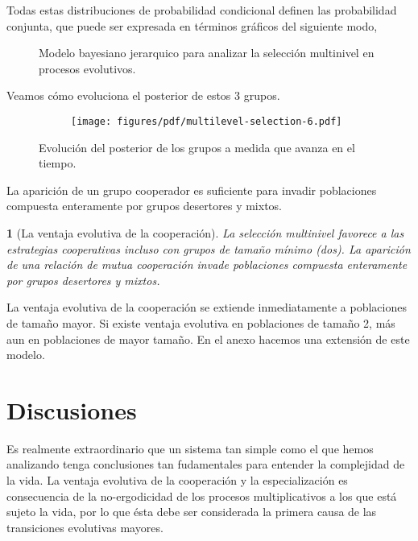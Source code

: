 \documentclass[a4paper,10pt]{article}
\newif\ifen
\newif\ifes
\newcommand{\en}[1]{\ifen#1\fi}
\newcommand{\es}[1]{\ifes#1\fi}
\newtheorem{conclution}{\en{Conclution}\es{Conclusión}}%
\begin{document}
Todas estas distribuciones de probabilidad condicional definen las probabilidad conjunta, que puede ser expresada en términos gráficos del siguiente modo,
%
\begin{figure}[H]
\centering
{}
\caption{
Modelo bayesiano jerarquico para analizar la selección multinivel en procesos evolutivos.
}
\label{fig:modelo_grafico}
\end{figure}
%
Veamos cómo evoluciona el posterior de estos 3 grupos.
%
\begin{figure}[H]
    \centering
    \begin{subfigure}[b]{0.66\textwidth}
    \texttt{[image: figures/pdf/multilevel-selection-6.pdf]}
    \end{subfigure}
    \caption{
    Evolución del posterior de los grupos a medida que avanza en el tiempo.
    }
    \label{fig:multilevel-selection-6}
\end{figure}
%
La aparición de un grupo cooperador es suficiente para invadir poblaciones compuesta enteramente por grupos desertores y mixtos.
%
\begin{conclution}[La ventaja evolutiva de la cooperación]
La selección multinivel favorece a las estrategias cooperativas incluso con grupos de tamaño mínimo (dos).
La aparición de una relación de mutua cooperación invade poblaciones compuesta enteramente por grupos desertores y mixtos.
\end{conclution}
%
La ventaja evolutiva de la cooperación se extiende inmediatamente a poblaciones de tamaño mayor.
Si existe ventaja evolutiva en poblaciones de tamaño 2, más aun en poblaciones de mayor tamaño.
En el anexo hacemos una extensión de este modelo.

\section{Discusiones}

Es realmente extraordinario que un sistema tan simple como el que hemos analizando tenga conclusiones tan fudamentales para entender la complejidad de la vida.
La ventaja evolutiva de la cooperación y la especialización es consecuencia de la no-ergodicidad de los procesos multiplicativos a los que está sujeto la vida, por lo que ésta debe ser considerada la primera causa de las transiciones evolutivas mayores.
\end{document}
